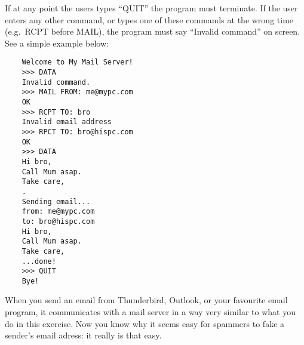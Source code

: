 \documentclass{article}
\begin{document}
If at any point the users types ``QUIT'' the program must
terminate. If the user enters any other command, or types one of these
commands at the wrong time (e.g.~RCPT before MAIL), the program must
say ``Invalid command'' on screen. See a simple example below: 

\begin{verbatim}
    Welcome to My Mail Server!
    >>> DATA
    Invalid command. 
    >>> MAIL FROM: me@mypc.com
    OK
    >>> RCPT TO: bro
    Invalid email address
    >>> RPCT TO: bro@hispc.com
    OK
    >>> DATA
    Hi bro, 
    Call Mum asap.
    Take care,
    .
    Sending email...
    from: me@mypc.com
    to: bro@hispc.com
    Hi bro, 
    Call Mum asap.
    Take care,
    ...done!
    >>> QUIT
    Bye!    
\end{verbatim}

When you send an email from Thunderbird, Outlook, or your favourite
email program, it communicates with a mail server in a way very
similar to what you do in this exercise. Now you know why it seems
easy for spammers to fake a sender's email adress: it
really is that easy.
\end{document}
